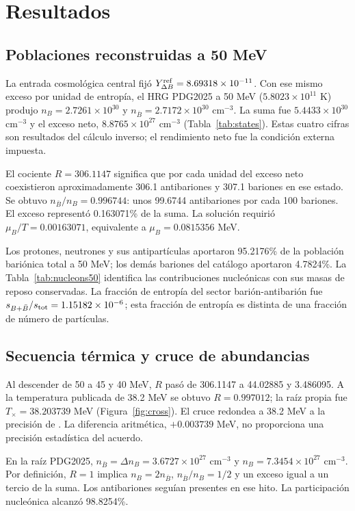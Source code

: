 \section{Resultados}
\subsection{Poblaciones reconstruidas a 50 MeV}
La entrada cosmológica central fijó $Y_{\Delta B}^{\rm ref}=8.69318\times10^{-11}$. Con ese mismo exceso por unidad de entropía, el HRG PDG2025 a 50 MeV ($5.8023\times10^{11}$ K) produjo $n_B=2.7261\times10^{30}$ y $n_{\bar B}=2.7172\times10^{30}$ cm$^{-3}$. La suma fue $5.4433\times10^{30}$ cm$^{-3}$ y el exceso neto, $8.8765\times10^{27}$ cm$^{-3}$ (Tabla~\ref{tab:states}). Estas cuatro cifras son resultados del cálculo inverso; el rendimiento neto fue la condición externa impuesta.

El cociente $R=306.1147$ significa que por cada unidad del exceso neto coexistieron aproximadamente 306.1 antibariones y 307.1 bariones en ese estado. Se obtuvo $n_{\bar B}/n_B=0.996744$: unos 99.6744 antibariones por cada 100 bariones. El exceso representó 0.163071\% de la suma. La solución requirió $\mu_B/T=0.00163071$, equivalente a $\mu_B=0.0815356$ MeV.



Los protones, neutrones y sus antipartículas aportaron 95.2176\% de la población bariónica total a 50 MeV; los demás bariones del catálogo aportaron 4.7824\%. La Tabla~\ref{tab:nucleons50} identifica las contribuciones nucleónicas con sus masas de reposo conservadas. La fracción de entropía del sector barión-antibarión fue $s_{B+\bar B}/s_{\rm tot}=1.15182\times10^{-6}$; esta fracción de entropía es distinta de una fracción de número de partículas.



\subsection{Secuencia térmica y cruce de abundancias}
Al descender de 50 a 45 y 40 MeV, $R$ pasó de 306.1147 a 44.02885 y 3.486095. A la temperatura publicada de 38.2 MeV se obtuvo $R=0.997012$; la raíz propia fue $T_\times=38.203739$ MeV (Figura~\ref{fig:cross}). El cruce redondea a 38.2 MeV a la precisión de \citet{Yang2022}. La diferencia aritmética, $+0.003739$ MeV, no proporciona una precisión estadística del acuerdo.

En la raíz PDG2025, $n_{\bar B}=\Delta n_B=3.6727\times10^{27}$ cm$^{-3}$ y $n_B=7.3454\times10^{27}$ cm$^{-3}$. Por definición, $R=1$ implica $n_B=2n_{\bar B}$, $n_{\bar B}/n_B=1/2$ y un exceso igual a un tercio de la suma. Los antibariones seguían presentes en ese hito. La participación nucleónica alcanzó 98.8254\%.

